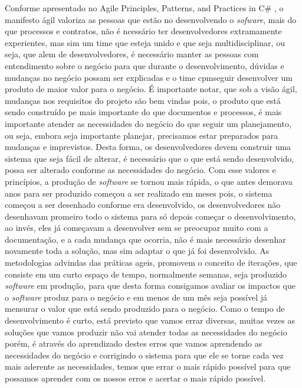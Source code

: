       Conforme apresentado no Agile Principles, Patterns, and Practices in C\#
      \cite{martin2007agile}, o manifesto ágil valoriza as pessoas que estão
      no desenvolvendo o \textit{sofware}, mais do que processos e contratos,
      não é ncessário ter desenvolvedores extramamente experientes, mas sim
      um time que esteja unido e que seja multidisciplinar, ou seja, que alem de
      desenvolvedores, é necessário manter as pessoas com entendimento sobre o
      negócio para que durante o desenvolvimento, dúvidas e mudanças no negócio
      possam ser explicadas e o time cpmseguir desenvolver um produto de maior
      valor para o negócio. É importante notar, que sob a visão ágil, mudanças
      nos requisitos do projeto são bem vindas pois, o produto que está sendo
      construído pe mais importante do que documentos e processos, é mais
      importante atender as necessidades do negócio do que seguir um planejamento,
      ou seja, embora seja importante planejar, precisamos estar preparados para
      mudanças e imprevistos. Desta forma, os desenvolvedores devem construir
      uma sistema que seja fácil de alterar, é necessário que o que está sendo
      desenvolvido, possa ser alterado conforme as necessidades do negócio. \newline
      Com esse valores e princípios, a produção de \textit{software} se tornou
      mais rápida, o que antes demorava anos para ser produzido começou a ser
      realizado em meses pois, o sistema começou a ser desenhado conforme era
      desenvolvido, os desenvolvedores não desenhavam promeiro todo o sistema
      para só depois começar o desenvolvimento, ao invés, eles já começavam a
      desenvolver sem se preocupar muito com a documentação, e a cada mudança
      que ocorria, não é mais necessário desenhar novamente toda a solução, mas
      sim adaptar o que já foi desenvolvido. \newline
      As metodologias advindas das práticas ageis, promovem o conceito de iterações,
      que consiste em um curto espaço de tempo, normalmente semanas, seja produzido
      \textit{software} em produção, para que desta forma consigamos avaliar os
      impactos que o \textit{software} produz para o negócio e em menos de um
      mês seja possível já mensurar o valor que está sendo produzido para o
      negócio. Como o tempo de desenvolvimento é curto, está previsto que vamos
      errar diversas, muitas vezes as soluções que vamos produzir não vai atender
      todas as necessidades do negócio porém, é através do aprendizado destes erros
      que vamos aprendendo as necessidades do negócio e corrigindo o sistema para
      que ele se torne cada vez mais aderente as necessidades, temos que errar o
      mais rápido possível para que possamos aprender com os nossos erros e acertar
      o mais rápido possível.

